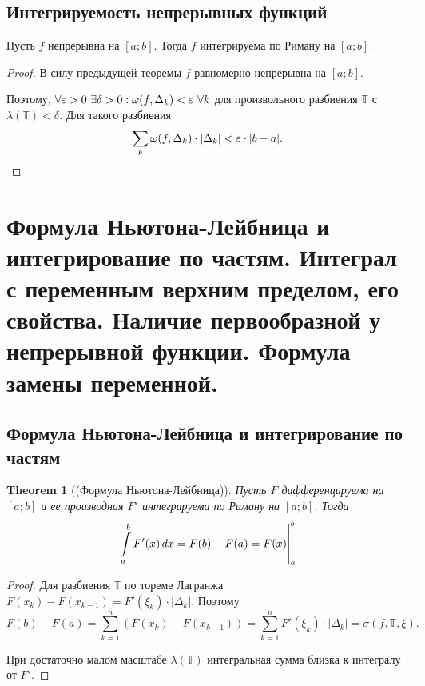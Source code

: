 \documentclass[a4paper]{article}
\theoremstyle{named}
\newtheorem*{namedtheorem}{Theorem}
\newcommand{\T}{\mathbb{T}}
\renewcommand{\int}{\intop}
\begin{document}
        \subsection{Интегрируемость непрерывных функций}

        \begin{consequence*}
            Пусть $f$ непрерывна на $[a; b]$. Тогда $f$ интегрируема по Риману на $[a; b]$.
        \end{consequence*}

        \begin{proof}
            В силу предыдущей теоремы $f$ равномерно непрерывна на $[a; b]$.

            Поэтому, $\forall \varepsilon > 0 \ \exists \delta > 0: \omega(f, \Delta_k) < \varepsilon \ \forall k$ для произвольного разбиения $\T$ с $\lambda(\T) < \delta$. Для такого разбиения
            \begin{equation*}
                \sum_k \omega(f, \Delta_k) \cdot |\Delta_k| < \varepsilon \cdot |b - a|.
            \end{equation*}
        \end{proof}

    \section{Формула Ньютона-Лейбница и интегрирование по частям. Интеграл с переменным верхним пределом, его свойства. Наличие первообразной у непрерывной функции. Формула замены переменной.}

        \subsection{Формула Ньютона-Лейбница и интегрирование по частям}

        \begin{namedtheorem}[(Формула Ньютона-Лейбница)]
            Пусть $F$ дифференцируема на $[a; b]$ и ее производная $F'$ интегрируема по Риману на $[a; b]$. Тогда
            \begin{equation*}
                \left. \int_a^b F'(x) \dd x = F(b) - F(a) = F(x) \right|_a^b
            \end{equation*}
        \end{namedtheorem}

        \begin{proof}
            Для разбиения $\T$ по тореме Лагранжа $F(x_k) - F(x_{k - 1}) = F'(\xi_k) \cdot |\Delta_k|$. Поэтому
            \begin{equation*}
                F(b) - F(a) = \sum_{k = 1}^n (F(x_k) - F(x_{k - 1})) = \sum_{k = 1}^n F'(\xi_k) \cdot |\Delta_k| = \sigma(f, \T, \xi).
            \end{equation*}

            При достаточно малом масштабе $\lambda(\T)$ интегральная сумма близка к интегралу от $F'$.
        \end{proof}
\end{document}
